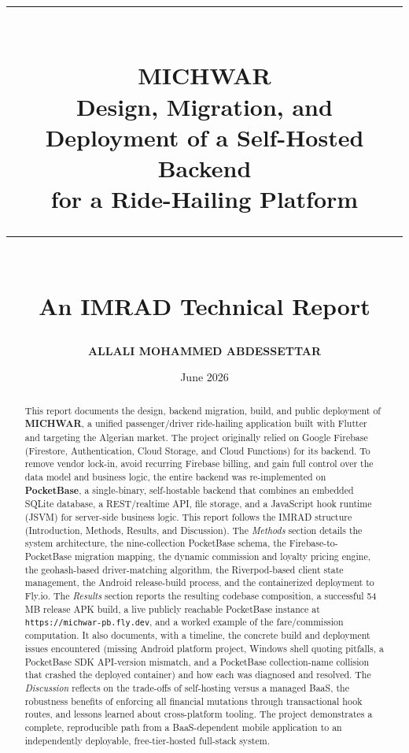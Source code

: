\documentclass[11pt,a4paper]{article}
\title{
  \vspace{-1.5cm}
  \rule{\linewidth}{0.5pt}\\[0.4cm]
  {\Huge \textbf{MICHWAR}}\\[0.3cm]
  {\Large Design, Migration, and Deployment of a Self-Hosted Backend\\
   for a Ride-Hailing Platform}\\[0.3cm]
  \rule{\linewidth}{0.5pt}\\[0.6cm]
  {\large An IMRAD Technical Report}
}
\author{\textbf{ALLALI MOHAMMED ABDESSETTAR}}
\date{June 2026}
\begin{document}
\maketitle
\thispagestyle{empty}

\begin{abstract}
\noindent
This report documents the design, backend migration, build, and public
deployment of \textbf{MICHWAR}, a unified passenger/driver ride-hailing
application built with Flutter and targeting the Algerian market. The
project originally relied on Google Firebase (Firestore, Authentication,
Cloud Storage, and Cloud Functions) for its backend. To remove vendor
lock-in, avoid recurring Firebase billing, and gain full control over the
data model and business logic, the entire backend was re-implemented on
\textbf{PocketBase}, a single-binary, self-hostable backend that combines an
embedded SQLite database, a REST/realtime API, file storage, and a
JavaScript hook runtime (JSVM) for server-side business logic. This report
follows the IMRAD structure (Introduction, Methods, Results, and
Discussion). The \textit{Methods} section details the system architecture,
the nine-collection PocketBase schema, the Firebase-to-PocketBase migration
mapping, the dynamic commission and loyalty pricing engine, the
geohash-based driver-matching algorithm, the Riverpod-based client state
management, the Android release-build process, and the containerized
deployment to Fly.io. The \textit{Results} section reports the resulting
codebase composition, a successful 54\,MB release APK build, a live
publicly reachable PocketBase instance at
\texttt{https://michwar-pb.fly.dev}, and a worked example of the fare/commission
computation. It also documents, with a timeline, the concrete build and
deployment issues encountered (missing Android platform project, Windows
shell quoting pitfalls, a PocketBase SDK API-version mismatch, and a
PocketBase collection-name collision that crashed the deployed container)
and how each was diagnosed and resolved. The \textit{Discussion} reflects on
the trade-offs of self-hosting versus a managed BaaS, the robustness
benefits of enforcing all financial mutations through transactional hook
routes, and lessons learned about cross-platform tooling. The project
demonstrates a complete, reproducible path from a BaaS-dependent mobile
application to an independently deployable, free-tier-hosted full-stack
system.
\end{abstract}

\tableofcontents
\newpage
\end{document}
